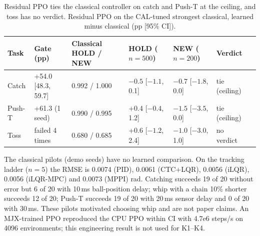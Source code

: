 \begin{table}[htbp]
\centering
\caption{Residual PPO ties the classical controller on catch and Push-T at the ceiling, and toss has no verdict. Residual PPO on the CAL-tuned strongest classical, learned minus classical (pp [95\% CI]).}
\label{tab:16a}
\begin{tabular}{@{}lllllll@{}}
\toprule
Task & Gate (pp) & Classical HOLD / NEW & HOLD ($n{=}500$) & NEW ($n{=}200$) & Verdict \\ \midrule
Catch & +54.0 [48.3, 59.7] & 0.992 / 1.000 & $-0.5$ [$-1.1$, 0.1] & $-0.7$ [$-1.8$, 0.0] & tie (ceiling) \\
Push-T & +61.3 (1 seed) & 0.990 / 0.995 & +0.4 [$-0.4$, 1.2] & $-1.5$ [$-3.5$, 0.0] & tie (ceiling) \\
Toss & failed 4 times & 0.680 / 0.685 & +0.6 [$-1.2$, 2.4] & $-1.0$ [$-3.0$, 1.0] & no verdict \\
\bottomrule
\end{tabular}
\end{table}

The classical pilots (demo seeds) have no learned comparison. On the tracking ladder ($n{=}5$) the RMSE is 0.0074 (PID), 0.0061 (CTC+LQR), 0.0056 (iLQR), 0.0056 (iLQR-MPC) and 0.0073 (MPPI) rad. Catching succeeds 19 of 20 without error but 6 of 20 with 10\,ms ball-position delay; whip with a chain 10\% shorter succeeds 12 of 20; Push-T succeeds 19 of 20 with 20\,ms sensor delay and 0 of 20 with 30\,ms. These pilots motivated choosing whip and are not paper claims. An MJX-trained PPO reproduced the CPU PPO within CI with 4.7e6 steps/s on 4096 environments; this engineering result is not used for K1--K4.
